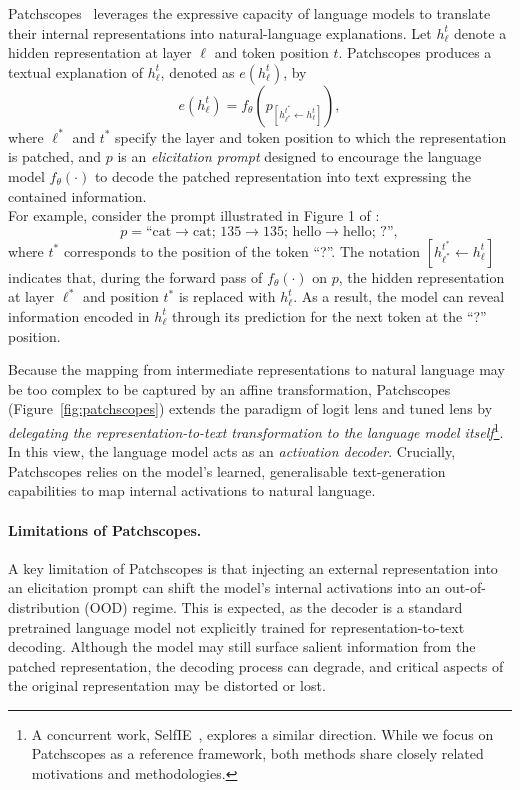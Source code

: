 \begin{definitionbox}
Patchscopes~ leverages the expressive capacity of language models to translate their internal representations into natural-language explanations. Let $h^t_\ell$ denote a hidden representation at layer $\ell$ and token position $t$. Patchscopes produces a textual explanation of $h^t_\ell$, denoted as $e(h^t_\ell)$, by
\[
e(h^t_\ell) = f_\theta(p_{[h^{t^*}_{\ell^*} \leftarrow h^t_\ell]}),
\]
where $\ell^*$ and $t^*$ specify the layer and token position to which the representation is patched, and $p$ is an \emph{elicitation prompt} designed to encourage the language model $f_\theta(\cdot)$ to decode the patched representation into text expressing the contained information.\\

For example, consider the prompt illustrated in Figure 1 of :
\[
p = \text{``cat$\rightarrow$cat; 135$\rightarrow$135; hello$\rightarrow$hello; ?''},
\]
where $t^*$ corresponds to the position of the token ``?''. The notation $[h^{t^*}_{\ell^*} \leftarrow h^t_\ell]$ indicates that, during the forward pass of $f_\theta(\cdot)$ on $p$, the hidden representation at layer $\ell^*$ and position $t^*$ is replaced with $h^t_\ell$. As a result, the model can reveal information encoded in $h^t_\ell$ through its prediction for the next token at the ``?'' position.
\end{definitionbox}

Because the mapping from intermediate representations to natural language may be too complex to be captured by an affine transformation, Patchscopes (Figure~\ref{fig:patchscopes}) extends the paradigm of logit lens and tuned lens by \emph{delegating the representation-to-text transformation to the language model itself}\footnote{A concurrent work, SelfIE~, explores a similar direction. While we focus on Patchscopes as a reference framework, both methods share closely related motivations and methodologies.}. In this view, the language model acts as an \emph{activation decoder}. Crucially, Patchscopes relies on the model's learned, generalisable text-generation capabilities to map internal activations to natural language.

\paragraph{Limitations of Patchscopes.}
A key limitation of Patchscopes is that injecting an external representation into an elicitation prompt can shift the model's internal activations into an out-of-distribution (OOD) regime. This is expected, as the decoder is a standard pretrained language model not explicitly trained for representation-to-text decoding. Although the model may still surface salient information from the patched representation, the decoding process can degrade, and critical aspects of the original representation may be distorted or lost.

